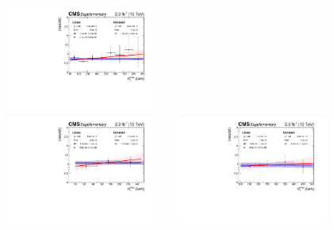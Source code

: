 \begin{figure}[tbhp]
\begin{center}
    \includegraphics[width=0.45\textwidth]{mht_eq0b_ge5j_ht_800_Inf_SingleMu_Graph_aux}  \\
    \includegraphics[width=0.45\textwidth]{mht_eq0b_eq3a_ht_200_250_DoubleMu_Graph_aux}  ~~
    \includegraphics[width=0.45\textwidth]{mht_eq0b_eq2j_ht_400_500_DoubleMu_Graph_aux}  \\
  \end{center}
\end{figure}


